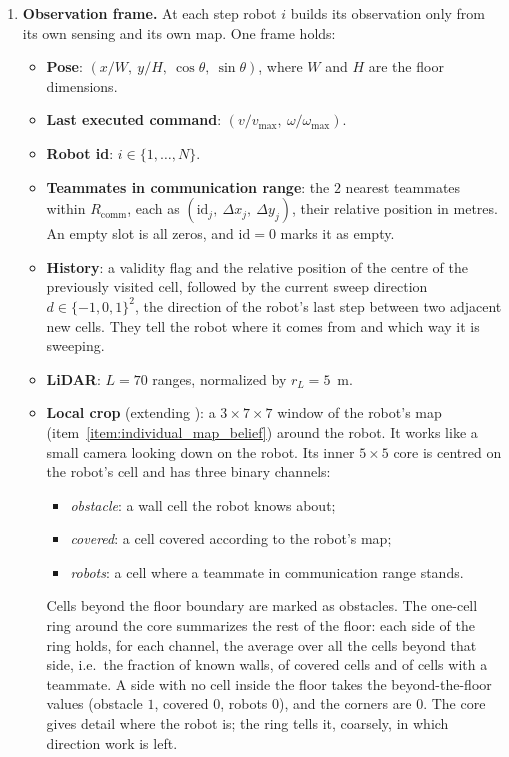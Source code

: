 \documentclass[11pt,a4paper]{article}
\begin{document}
\begin{enumerate}[label=\textbf{\arabic*.},resume]

\item \textbf{Observation frame.}
At each step robot $i$ builds its observation only from its own sensing and
its own map. One frame holds:
\begin{itemize}
 \item \textbf{Pose}: $(x/W,\ y/H,\ \cos\theta,\ \sin\theta)$, where $W$ and
       $H$ are the floor dimensions.
 \item \textbf{Last executed command}: $(v/v_{\max},\ \omega/\omega_{\max})$.
 \item \textbf{Robot id}: $i\in\{1,\dots,N\}$.
 \item \textbf{Teammates in communication range}: the $2$ nearest teammates
       within $R_{\mathrm{comm}}$, each as $(\mathrm{id}_j,\ \Delta x_j,\
       \Delta y_j)$, their relative position in metres. An empty slot is all
       zeros, and $\mathrm{id}=0$ marks it as empty.
 \item \textbf{History}: a validity flag and the relative position of the
       centre of the previously visited cell, followed by the current sweep
       direction $d\in\{-1,0,1\}^2$, the direction of the robot's last step
       between two adjacent new cells. They tell the robot where it comes
       from and which way it is sweeping.
 \item \textbf{LiDAR}: $L=70$ ranges, normalized by $r_L=5$~m.
 \item \textbf{Local crop} (extending \cite{hasan2025efficient}): a
       $3\times7\times7$ window of the robot's map
       (item~\ref{item:individual_map_belief}) around the robot. It works
       like a small camera looking down on the robot. Its inner $5\times5$
       core is centred on the robot's cell and has three binary channels:
       \begin{itemize}
        \item \textit{obstacle}: a wall cell the robot knows about;
        \item \textit{covered}: a cell covered according to the robot's map;
        \item \textit{robots}: a cell where a teammate in communication range
              stands.
       \end{itemize}
       Cells beyond the floor boundary are marked as obstacles. The one-cell
       ring around the core summarizes the rest of the floor: each side of
       the ring holds, for each channel, the average over all the cells
       beyond that side, i.e.\ the fraction of known walls, of covered cells
       and of cells with a teammate. A side with no cell inside the floor
       takes the beyond-the-floor values (obstacle $1$, covered $0$, robots
       $0$), and the corners are $0$. The core gives detail where the robot
       is; the ring tells it, coarsely, in which direction work is left.
\end{itemize}


\end{enumerate}
\end{document}
